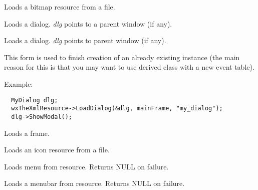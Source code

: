 \label{wxxmlresourceloadbitmap}


Loads a bitmap resource from a file.

\label{wxxmlresourceloaddialog}


Loads a dialog. {\it dlg} points to a parent window (if any).


Loads a dialog. {\it dlg} points to parent window (if any).

This form is used to finish creation of an already existing instance (the main reason
for this is that you may want to use derived class with a new event table).

Example:

\begin{verbatim}
  MyDialog dlg;
  wxTheXmlResource->LoadDialog(&dlg, mainFrame, "my_dialog");
  dlg->ShowModal();
\end{verbatim}

\label{wxxmlresourceloadframe}


Loads a frame.

\label{wxxmlresourceloadicon}


Loads an icon resource from a file.

\label{wxxmlresourceloadmenu}


Loads menu from resource. Returns NULL on failure.

\label{wxxmlresourceloadmenubar}


Loads a menubar from resource. Returns NULL on failure.

